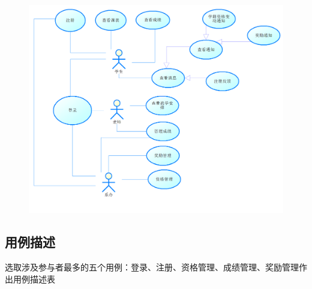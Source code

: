 \documentclass[12pt, a4paper, oneside]{ctexart}
\begin{document}
\begin{figure}[H]
    \centering
    \includegraphics[width = 1\textwidth]{../pic/2.png}
\end{figure}

\subsection{用例描述}

选取涉及参与者最多的五个用例：登录、注册、资格管理、成绩管理、奖励管理作出用例描述表
\end{document}

